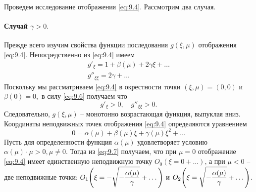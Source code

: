 Проведем исследование отображения \eqref{eq:9.4}. Рассмотрим два случая.

\paragraph{Случай $\gamma>0.$}%
Прежде всего изучим свойства функции последования $g(\xi,\mu)$ отображения
\eqref{eq:9.4}. Непосредственно из \eqref{eq:9.4} имеем
\begin{equation}
        \label{eq:9.6}
        \begin{gathered}
                g'_{\xi} = 1 + \beta(\mu) + 2 \gamma \xi+ \dots \\
                g''_{\xi\xi} = 2 \gamma + \dots
        \end{gathered}
\end{equation}
Поскольку мы рассматриваем \eqref{eq:9.4} в окрестности точки $(\xi,\mu)=(0,0)$ и $\beta(0)=0,$ 
в силу \eqref{eq:9.6} получаем что
\begin{equation}
        \label{eq:}
        g'_{\xi}>0,\quad g''_{\xi\xi}>0.
\end{equation}
Следовательно, $g(\xi,\mu)$ -- монотонно возрастающая функция, выпуклая вниз.
Координаты неподвижных точек отображения \eqref{eq:9.4} определяются уравнением
\begin{equation}
        \label{eq:9.7}
        0 = \alpha(\mu) + \beta(\mu) \xi + \gamma(\mu) \xi^2 + \dots
\end{equation}
Пусть для определенности функция $\alpha(\mu)$ удовлетворяет условию $\alpha(\mu)\cdot \mu>0, \mu \neq 0.$ Тогда из \eqref{eq:9.7} получаем, что при $\mu=0$ отображение \eqref{eq:9.4} имеет единственную неподвижную точку $O_0 (\xi=0+\dots)$, а при $\mu<0$ -- две неподвижные точки:
$\displaystyle O_1 \qty( \xi = - \sqrt{ -\frac{\alpha(\mu)}{\gamma}} + \dots )$ и
$\displaystyle O_2 \qty( \xi = \sqrt{ -\frac{\alpha(\mu)}{\gamma}}+\dots)$. 

